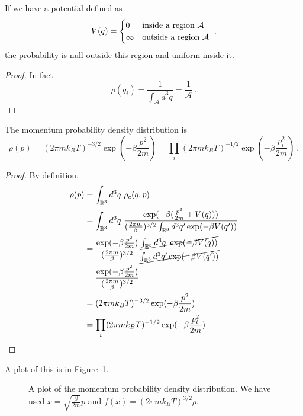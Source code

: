     If we have a potential defined as 
    \begin{equation*}
        V (q) = \begin{cases}
            0 & \textnormal{inside a region } \mathcal A\\
            \infty & \textnormal{outside a region } \mathcal A\\
        \end{cases} ~,
    \end{equation*}
    the probability is null outside this region and uniform inside it. 
    \begin{proof}
        In fact 
        \begin{equation*}
            \rho(q_i) = \frac{1}{\int_{\mathcal A} d^3 q} = \frac{1}{\mathcal A} ~. 
        \end{equation*}
    \end{proof}

    The momentum probability density distribution is 
    \begin{equation*}
        \rho(p) = (2\pi m k_B T)^{-3/2} \exp(- \beta \frac{p^2}{2m}) = \prod_i (2\pi m k_B T)^{-1/2} \exp(- \beta \frac{p^2_i}{2m}) ~.
    \end{equation*}
    \begin{proof}
        By definition, 
        \begin{equation*}
        \begin{aligned}
            \rho(p) & = \int_{\mathbb R^3} d^3 q ~ \rho_c (q, p) \\ & = \int_{\mathbb R^3} d^3 q ~ \frac{\exp (- \beta ( \frac{p^2}{2m} + V(q) ))}{(\frac{2\pi m}{\beta})^{3/2} \int_{\mathbb R^3} d^3 q' \exp(- \beta V(q'))} \\ & = \frac{\exp(- \beta \frac{p^2}{2m})}{(\frac{2\pi m}{\beta})^{3/2}} \frac{\cancel{\int_{\mathbb R^3} d^3 q ~ \exp (- \beta V(q) )}}{\cancel{\int_{\mathbb R^3} d^3 q' \exp(- \beta V(q'))}} \\ & = \frac{\exp(- \beta \frac{p^2}{2m})}{(\frac{2\pi m}{\beta})^{3/2}} \\ & = (2\pi m k_B T)^{-3/2} \exp(- \beta \frac{p^2}{2m}) \\ & = \prod_i (2\pi m k_B T)^{-1/2} \exp(- \beta \frac{p^2_i}{2m}) ~.
        \end{aligned}
        \end{equation*}
    \end{proof}
    A plot of this is in Figure~\ref{max:mom}.
    \begin{figure}[h!]
        \centering
        \caption{A plot of the momentum probability density distribution. We have used $x = \sqrt{\frac{\beta}{2m}} p$ and $f(x) = (2\pi m k_B T)^{3/2} \rho$.}
        \label{max:mom}
    \end{figure}
    

